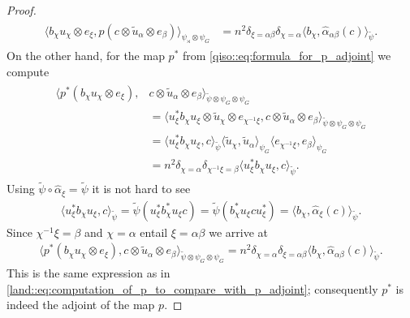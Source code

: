 \documentclass[10pt,a4paper]{amsart}
\begin{document}
\begin{proof}
\begin{align}
        \begin{aligned}
            \langle b_\chi u_\chi \otimes e_\xi, p(c \otimes \tilde{u}_\alpha \otimes e_\beta) \rangle_{\psi_{\rtimes} \otimes \psi_G}
            &= n^2 \delta_{\xi=\alpha\beta} \delta_{\chi=\alpha} \langle b_\chi, \hat{\alpha}_{\alpha\beta}(c) \rangle_{\tilde{\psi}}.
        \end{aligned}
    \end{align}
    On the other hand, for the map $p^\ast$ from \eqref{qiso::eq:formula_for_p_adjoint} we compute
    \begin{align*}
        \begin{aligned}
        \langle p^\ast(b_\chi u_\chi \otimes e_\xi), &c \otimes \tilde{u}_\alpha \otimes e_\beta \rangle_{\tilde{\psi} \otimes \psi_G \otimes \psi_G} \\
            &= \langle u_\xi^\ast b_\chi u_\xi \otimes \tilde{u}_\chi \otimes e_{\chi^{-1}\xi}, c \otimes \tilde{u}_\alpha \otimes e_\beta \rangle_{\tilde{\psi} \otimes \psi_G \otimes \psi_G} \\
            &= \langle u_\xi^\ast b_\chi u_\xi, c \rangle_{\tilde{\psi}} \langle \tilde{u}_\chi, \tilde{u}_\alpha \rangle_{\psi_G} \langle e_{\chi^{-1}\xi}, e_\beta \rangle_{\psi_G} \\
            &= n^2 \delta_{\chi=\alpha} \delta_{\chi^{-1} \xi = \beta} \langle u_\xi^\ast b_\chi u_\xi, c \rangle_{\tilde{\psi}}.
        \end{aligned}
    \end{align*}
    Using $\tilde{\psi} \circ \hat{\alpha}_\xi = \tilde{\psi}$ it is not hard to see
    \begin{align*}
        \langle u_\xi^\ast b_\chi u_\xi, c \rangle_{\tilde{\psi}} 
            = \tilde{\psi}(u_\xi^\ast b_\chi^\ast u_\xi c)
            = \tilde{\psi}(b_\chi^\ast u_\xi c u_\xi^\ast)
            = \langle b_\chi, \hat{\alpha}_\xi(c) \rangle_{\tilde{\psi}}.
    \end{align*}
    Since $\chi^{-1} \xi = \beta$ and $\chi=\alpha$ entail $\xi = \alpha \beta$ we arrive at
    \begin{align}
        \langle p^\ast(b_\chi u_\chi \otimes e_\xi), c \otimes \tilde{u}_\alpha \otimes e_\beta \rangle_{\tilde{\psi} \otimes \psi_G \otimes \psi_G}
            = n^2 \delta_{\chi=\alpha} \delta_{\xi = \alpha \beta} \langle b_\chi, \hat{\alpha}_{\alpha \beta}(c) \rangle_{\tilde{\psi}}.
    \end{align}
    This is the same expression as in \eqref{land::eq:computation_of_p_to_compare_with_p_adjoint}; consequently $p^\ast$ is indeed the adjoint of the map $p$.


\end{proof}
\end{document}
